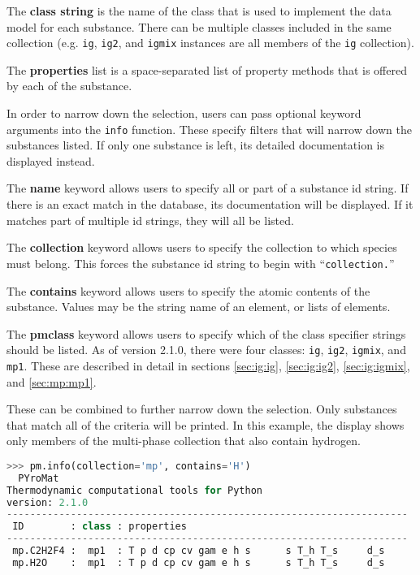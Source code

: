 The {\bf class string} is the name of the class that is used to implement the data model for each substance.  There can be multiple classes included in the same collection (e.g. \texttt{ig}, \texttt{ig2}, and \texttt{igmix} instances are all members of the \texttt{ig} collection).

The {\bf properties} list is a space-separated list of property methods that is offered by each of the substance.  

In order to narrow down the selection, users can pass optional keyword arguments into the \texttt{info} function.  These specify filters that will narrow down the substances listed.  If only one substance is left, its detailed documentation is displayed instead.

The {\bf name} keyword allows users to specify all or part of a substance id string.  If there is an exact match in the database, its documentation will be displayed.  If it matches part of multiple id strings, they will all be listed.

The {\bf collection} keyword allows users to specify the collection to which species must belong.  This forces the substance id string to begin with ``\verb|collection.|''

The {\bf contains} keyword allows users to specify the atomic contents of the substance.  Values may be the string name of an element, or lists of elements. 

The {\bf pmclass} keyword allows users to specify which of the class specifier strings should be listed.  As of version 2.1.0, there were four classes: \texttt{ig}, \texttt{ig2}, \texttt{igmix}, and \texttt{mp1}.  These are described in detail in sections \ref{sec:ig:ig}, \ref{sec:ig:ig2}, \ref{sec:ig:igmix}, and \ref{sec:mp:mp1}.

These can be combined to further narrow down the selection.  Only substances that match all of the criteria will be printed.  In this example, the display shows only members of the multi-phase collection that also contain hydrogen.
\begin{lstlisting}[language=Python,style=tinystyle]
>>> pm.info(collection='mp', contains='H')
  PYroMat
Thermodynamic computational tools for Python
version: 2.1.0
---------------------------------------------------------------------
 ID        : class : properties
---------------------------------------------------------------------
 mp.C2H2F4 :  mp1  : T p d cp cv gam e h s      s T_h T_s     d_s    
 mp.H2O    :  mp1  : T p d cp cv gam e h s      s T_h T_s     d_s    
\end{lstlisting}

